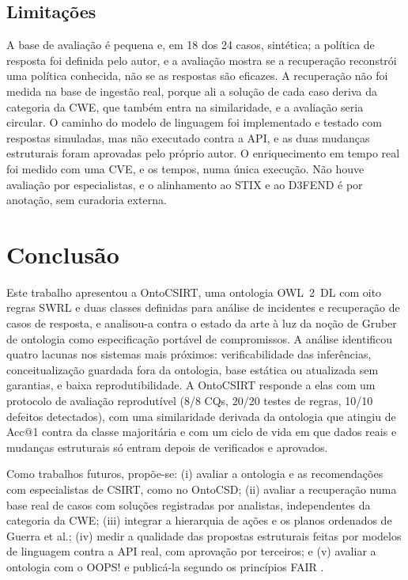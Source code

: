 \documentclass[12pt]{article}
\begin{document}
\subsection{Limitações}

A base de avaliação é pequena e, em 18 dos 24 casos, sintética; a política de resposta foi definida pelo autor, e a avaliação mostra se a recuperação reconstrói uma política conhecida, não se as respostas são eficazes. A recuperação não foi medida na base de ingestão real, porque ali a solução de cada caso deriva da categoria da CWE, que também entra na similaridade, e a avaliação seria circular. O caminho do modelo de linguagem foi implementado e testado com respostas simuladas, mas não executado contra a API, e as duas mudanças estruturais foram aprovadas pelo próprio autor. O enriquecimento em tempo real foi medido com uma CVE, e os tempos, numa única execução. Não houve avaliação por especialistas, e o alinhamento ao STIX e ao D3FEND é por anotação, sem curadoria externa.

\section{Conclusão}
\label{sec:conc}

Este trabalho apresentou a OntoCSIRT, uma ontologia OWL~2~DL com oito regras SWRL e duas classes definidas para análise de incidentes e recuperação de casos de resposta, e analisou-a contra o estado da arte à luz da noção de Gruber de ontologia como especificação portável de compromissos. A análise identificou quatro lacunas nos sistemas mais próximos: verificabilidade das inferências, conceitualização guardada fora da ontologia, base estática ou atualizada sem garantias, e baixa reprodutibilidade. A OntoCSIRT responde a elas com um protocolo de avaliação reprodutível (8/8 CQs, 20/20 testes de regras, 10/10 defeitos detectados), com uma similaridade derivada da ontologia que atingiu \accVseven{} de Acc@1 contra \accMaj{} da classe majoritária e com um ciclo de vida em que dados reais e mudanças estruturais só entram depois de verificados e aprovados.

Como trabalhos futuros, propõe-se: (i) avaliar a ontologia e as recomendações com especialistas de CSIRT, como no OntoCSD; (ii) avaliar a recuperação numa base real de casos com soluções registradas por analistas, independentes da categoria da CWE; (iii) integrar a hierarquia de ações e os planos ordenados de Guerra et al.; (iv) medir a qualidade das propostas estruturais feitas por modelos de linguagem contra a API real, com aprovação por terceiros; e (v) avaliar a ontologia com o OOPS! \cite{poveda2014oops} e publicá-la segundo os princípios FAIR \cite{oliveira2021fair}.
\end{document}

